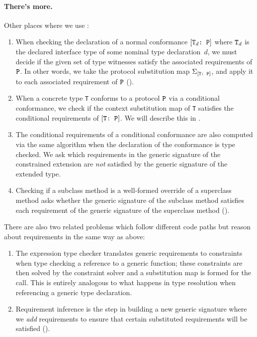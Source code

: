 \documentclass[../generics]{subfiles}
\begin{document}
\paragraph{There's more.} Other places where we use :
\begin{enumerate}
\item When checking the declaration of a normal conformance $[\texttt{$\texttt{T}_d$:~P}]$ where $\texttt{T}_d$ is the declared interface type of some nominal type declaration~$d$, we must decide if the given set of type witnesses satisfy the associated requirements of $\texttt{P}$. In other words, we take the protocol substitution map $\Sigma_{[\texttt{T:~P}]}$, and apply it to each associated requirement of $\texttt{P}$ ().

\item When a concrete type \texttt{T} conforms to a protocol $\texttt{P}$ via a conditional conformance, we check if the context substitution map of \texttt{T} satisfies the conditional requirements of $[\texttt{T:~P}]$. We will describe this in .

\item The conditional requirements of a conditional conformance are also computed via the same algorithm when the declaration of the conformance is type checked. We ask which requirements in the generic signature of the constrained extension are \emph{not} satisfied by the generic signature of the extended type.

\item Checking if a subclass method is a well-formed override of a superclass method asks whether the generic signature of the subclass method satisfies each requirement of the generic signature of the superclass method ().
\end{enumerate}
There are also two related problems which follow different code paths but reason about requirements in the same way as above:
\begin{enumerate}
\item The expression type checker translates generic requirements to constraints when type checking a reference to a generic function; these constraints are then solved by the constraint solver and a substitution map is formed for the call. This is entirely analogous to what happens in type resolution when referencing a generic type declaration.

\item Requirement inference is the step in building a new generic signature where we \emph{add} requirements to ensure that certain substituted requirements will be satisfied ().
\end{enumerate}
\end{document}
